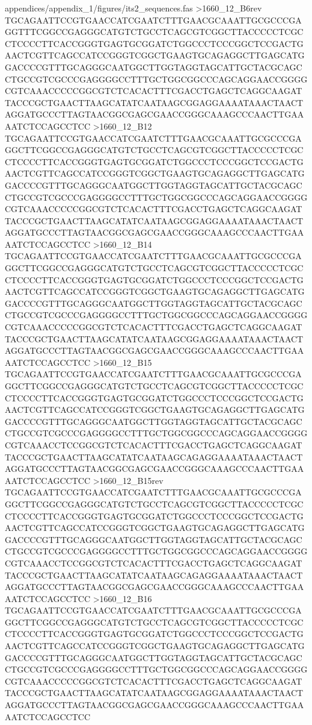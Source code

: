 {\begin{filecontents*}{appendices/appendix_1/figures/its2_sequences.fas}
>1660_12_B6rev
TGCAGAATTCCGTGAACCATCGAATCTTTGAACGCAAATTGCGCCCGAGGTTTCGGCCGAGGGCATGTCTGCCTCAGCGTCGGCTTACCCCCTCGCCTCCCCTTCACCGGGTGAGTGCGGATCTGGCCCTCCCGGCTCCGACTGAACTCGTTCAGCCATCCGGGTCGGCTGAAGTGCAGAGGCTTGAGCATGGACCCCGTTTGCAGGGCAATGGCTTGGTAGGTAGCATTGCTACGCAGCCTGCCGTCGCCCGAGGGGCCTTTGCTGGCGGCCCAGCAGGAACCGGGGCGTCAAACCCCCGGCGTCTCACACTTTCGACCTGAGCTCAGGCAAGATTACCCGCTGAACTTAAGCATATCAATAAGCGGAGGAAAATAAACTAACTAGGATGCCCTTAGTAACGGCGAGCGAACCGGGCAAAGCCCAACTTGAAAATCTCCAGCCTCC
>1660_12_B12
TGCAGAATTCCGTGAACCATCGAATCTTTGAACGCAAATTGCGCCCGAGGCTTCGGCCGAGGGCATGTCTGCCTCAGCGTCGGCTTACCCCCTCGCCTCCCCTTCACCGGGTGAGTGCGGATCTGGCCCTCCCGGCTCCGACTGAACTCGTTCAGCCATCCGGGTCGGCTGAAGTGCAGAGGCTTGAGCATGGACCCCGTTTGCAGGGCAATGGCTTGGTAGGTAGCATTGCTACGCAGCCTGCCGTCGCCCGAGGGGCCTTTGCTGGCGGCCCAGCAGGAACCGGGGCGTCAAACCCCCGGCGTCTCACACTTTCGACCTGAGCTCAGGCAAGATTACCCGCTGAACTTAAGCATATCAATAAGCGGAGGAAAATAAACTAACTAGGATGCCCTTAGTAACGGCGAGCGAACCGGGCAAAGCCCAACTTGAAAATCTCCAGCCTCC
>1660_12_B14
TGCAGAATTCCGTGAACCATCGAATCTTTGAACGCAAATTGCGCCCGAGGCTTCGGCCGAGGGCATGTCTGCCTCAGCGTCGGCTTACCCCCTCGCCTCCCCTTCACCGGGTGAGTGCGGATCTGGCCCTCCCGGCTCCGACTGAACTCGTTCAGCCATCCGGGTCGGCTGAAGTGCAGAGGCTTGAGCATGGACCCCGTTTGCAGGGCAATGGCTTGGTAGGTAGCATTGCTACGCAGCCTGCCGTCGCCCGAGGGGCCTTTGCTGGCGGCCCAGCAGGAACCGGGGCGTCAAACCCCCGGCGTCTCACACTTTCGACCTGAGCTCAGGCAAGATTACCCGCTGAACTTAAGCATATCAATAAGCGGAGGAAAATAAACTAACTAGGATGCCCTTAGTAACGGCGAGCGAACCGGGCAAAGCCCAACTTGAAAATCTCCAGCCTCC
>1660_12_B15
TGCAGAATTCCGTGAACCATCGAATCTTTGAACGCAAATTGCGCCCGAGGCTTCGGCCGAGGGCATGTCTGCCTCAGCGTCGGCTTACCCCCTCGCCTCCCCTTCACCGGGTGAGTGCGGATCTGGCCCTCCCGGCTCCGACTGAACTCGTTCAGCCATCCGGGTCGGCTGAAGTGCAGAGGCTTGAGCATGGACCCCGTTTGCAGGGCAATGGCTTGGTAGGTAGCATTGCTACGCAGCCTGCCGTCGCCCGAGGGGCCTTTGCTGGCGGCCCAGCAGGAACCGGGGCGTCAAACCTCCGGCGTCTCACACTTTCGACCTGAGCTCAGGCAAGATTACCCGCTGAACTTAAGCATATCAATAAGCAGAGGAAAATAAACTAACTAGGATGCCCTTAGTAACGGCGAGCGAACCGGGCAAAGCCCAACTTGAAAATCTCCAGCCTCC
>1660_12_B15rev
TGCAGAATTCCGTGAACCATCGAATCTTTGAACGCAAATTGCGCCCGAGGCTTCGGCCGAGGGCATGTCTGCCTCAGCGTCGGCTTACCCCCTCGCCTCCCCTTCACCGGGTGAGTGCGGATCTGGCCCTCCCGGCTCCGACTGAACTCGTTCAGCCATCCGGGTCGGCTGAAGTGCAGAGGCTTGAGCATGGACCCCGTTTGCAGGGCAATGGCTTGGTAGGTAGCATTGCTACGCAGCCTGCCGTCGCCCGAGGGGCCTTTGCTGGCGGCCCAGCAGGAACCGGGGCGTCAAACCTCCGGCGTCTCACACTTTCGACCTGAGCTCAGGCAAGATTACCCGCTGAACTTAAGCATATCAATAAGCAGAGGAAAATAAACTAACTAGGATGCCCTTAGTAACGGCGAGCGAACCGGGCAAAGCCCAACTTGAAAATCTCCAGCCTCC
>1660_12_B16
TGCAGAATTCCGTGAACCATCGAATCTTTGAACGCAAATTGCGCCCGAGGCTTCGGCCGAGGGCATGTCTGCCTCAGCGTCGGCTTACCCCCTCGCCTCCCCTTCACCGGGTGAGTGCGGATCTGGCCCTCCCGGCTCCGACTGAACTCGTTCAGCCATCCGGGTCGGCTGAAGTGCAGAGGCTTGAGCATGGACCCCGTTTGCAGGGCAATGGCTTGGTAGGTAGCATTGCTACGCAGCCTGCCGTCGCCCGAGGGGCCTTTGCTGGCGGCCCAGCAGGAACCGGGGCGTCAAACCCCCGGCGTCTCACACTTTCGACCTGAGCTCAGGCAAGATTACCCGCTGAACTTAAGCATATCAATAAGCGGAGGAAAATAAACTAACTAGGATGCCCTTAGTAACGGCGAGCGAACCGGGCAAAGCCCAACTTGAAAATCTCCAGCCTCC

\end{filecontents*}}
